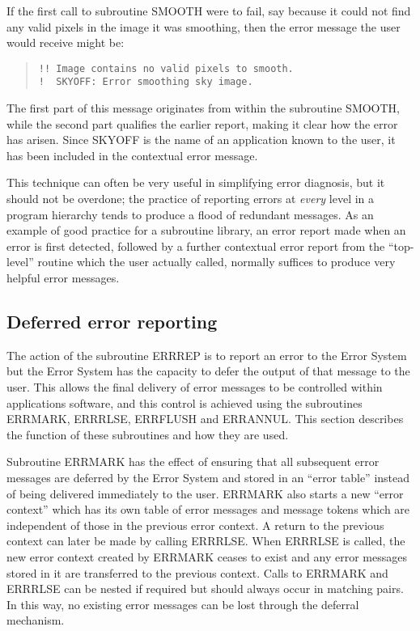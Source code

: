 \documentclass[twoside,11pt]{article}
\newcommand{\xlabel}[1]{}
\renewcommand{\_}{\texttt{\symbol{95}}}
\begin{document}
If the first call to subroutine SMOOTH were to fail, say because it could not
find any valid pixels in the image it was smoothing, then the error message
the user would receive might be:

\begin {quote}
\begin {small}
\begin{verbatim}
!! Image contains no valid pixels to smooth.
!  SKYOFF: Error smoothing sky image.
\end{verbatim}
\end {small}
\end {quote}

The first part of this message originates from within the subroutine SMOOTH,
while the second part qualifies the earlier report, making it clear how the
error has arisen.
Since SKYOFF is the name of an application known to the user, it has been
included in the contextual error message.

This technique can often be very useful in simplifying error diagnosis, but
it should not be overdone; the practice of reporting errors at \emph{every}
level in a program hierarchy tends to produce a flood of redundant messages.
As an example of good practice for a subroutine library, an error report made
when an error is first detected, followed by a further contextual error report
from the ``top-level'' routine which the user actually called, normally
suffices to produce very helpful error messages.


\subsection{\xlabel{deferred_error_reporting}Deferred error reporting \label{errdef_sect}}

The action of the subroutine ERR\_REP is to report an error to the
Error System but the Error System has the capacity to defer the output of
that message to the user.
This allows the final delivery of error messages to be controlled within
applications software, and this control is achieved using the subroutines
ERR\_MARK, ERR\_RLSE, ERR\_FLUSH and ERR\_ANNUL.
This section describes the function of these subroutines and how they are
used.

Subroutine ERR\_MARK has the effect of ensuring that all subsequent error
messages are deferred by the Error System and stored in an ``error table''
instead of being delivered immediately to the user.
ERR\_MARK also starts a new ``error context'' which has its own table of error
messages and message tokens which are independent of those in the previous
error context.
A return to the previous context can later be made by calling ERR\_RLSE.
When ERR\_RLSE is called, the new error context created by ERR\_MARK ceases
to exist and any error messages stored in it are transferred to the
previous context.
Calls to ERR\_MARK and ERR\_RLSE can be nested if required but should always
occur in matching pairs.
In this way, no existing error messages can be lost through the deferral
mechanism.
\end{document}
